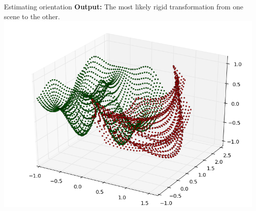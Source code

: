 \documentclass[final]{beamer}
\begin{document}
\begin{frame}{}
\begin{textblock}{27}
\begin{block}{Estimating orientation}
\textbf{Output:} The most likely rigid transformation from one scene to the other.
\includegraphics[width=10in]{3DWorldModel.png}
\end{block}


\end{textblock}
\end{frame}
\end{document}
